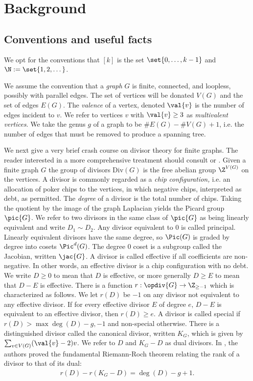 \section{Background}
\label{sec:background}


\subsection{Conventions and useful facts}\label{ssec:conventions}
We opt for the conventions that $[k]$ is the set $\set{0,\dots,k-1}$ and $\N:=\set{1,2,\dots}$. 

\begin{defi}[Graph]\label{def-Graph}
We assume the convention that a \textit{graph} $G$ is finite, connected, and loopless, possibly with parallel edges. The set of vertices will be donated $V(G)$ and the set of edges $E(G)$. The \textit{valence} of a vertex, denoted $\val{v}$ is the number of edges incident to $v$. We refer to vertices $v$ with $\val{v} \geq 3$ as \emph{multivalent vertices}. We take the genus $g$ of a graph to be $\#E(G)- \#V(G)+1$, i.e. the number of edges that must be removed to produce a spanning tree.
\end{defi}

We next give a very brief crash course on divisor theory for finite graphs. The reader interested in a more comprehensive treatment should consult \cite{corry2018divisors} or \cite{jensenNotices}. Given a finite graph $G$ the group of divisors $\mathrm{Div}(G)$ is the free abelian group $\Z^{V(G)}$ on the vertices. 
A divisor is commonly regarded as a \emph{chip configuration,} i.e. an allocation of poker chips to the vertices, in which negative chips, interpreted as debt, as permitted. The \emph{degree} of a divisor is the total number of chips. 
Taking the quotient by the image of the graph Laplacian yields the Picard group $\pic{G}$. We refer to two divisors in the same class of $\pic{G}$ as being linearly equivalent and write $D_1 \sim D_2$. Any divisor equivalent to $0$ is called principal. 
Linearly equivalent divisors have the same degree, so $\Pic(G)$ is graded by degree into cosets $\Pic^d(G)$.
The degree $0$ coset is a subgroup called the Jacobian, written $\jac{G}$. A divisor is called effective if all coefficients are non-negative. In other words, an effective divisor is a chip configuration with no debt. We write $D \geq 0$ to mean that $D$ is effective, or more generally $D \geq E$ to mean that $D-E$ is effective. There is a function $r:\opdiv{G} \to \Z_{\geq -1}$ which is characterized as follows. We let $r(D)$ be $-1$ on any divisor not equivalent to any effective divisor. If for every effective divisor $E$ of degree $e$, $D-E$ is equivalent to an effective divisor, then $r(D) \geq e$. A divisor is called special if $r(D) > \max{\deg(D)-g, -1}$ and non-special otherwise. There is a distinguished divisor called the canonical divisor, written $K_G$, which is given by $\sum_{v \in V(G)}(\val{v}-2)v$. We refer to $D$ and $K_G-D$ as dual divisors. In \cite{BakNor07}, the authors proved the fundamental Riemann-Roch theorem relating the rank of a divisor to that of its dual:
\begin{align*}
    r(D) - r(K_G-D) = \deg(D)-g + 1.
\end{align*}

